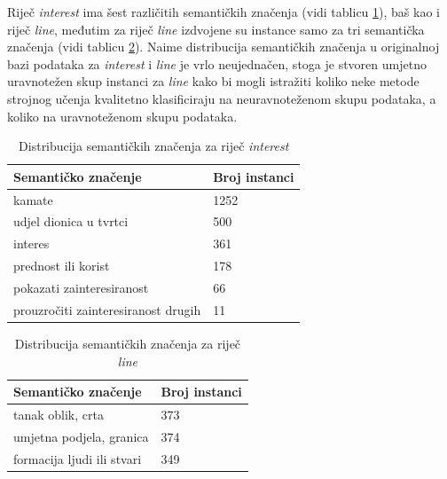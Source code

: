 \documentclass[10pt, a4paper]{article}
\begin{document}
Riječ \emph{interest} ima šest različitih semantičkih značenja (vidi tablicu \ref{tab:interest_distribution}), baš kao i riječ \emph{line},
međutim za riječ \emph{line} izdvojene su instance samo za tri semantička značenja
(vidi tablicu \ref{tab:line_distribution}). Naime distribucija semantičkih značenja u 
originalnoj bazi podataka za \emph{interest} i \emph{line} je vrlo neujednačen,
stoga je stvoren umjetno uravnotežen skup instanci za \emph{line} kako
bi mogli istražiti koliko neke metode strojnog učenja
kvalitetno klasificiraju na neuravnoteženom skupu podataka, 
a koliko na uravnoteženom skupu podataka.

\begin{table}[!hbtp]
\caption{Distribucija semantičkih značenja za riječ \emph{interest}}
\label{tab:interest_distribution}
\begin{center}
\begin{tabular}{ll}
\toprule
Semantičko značenje & Broj instanci \\
\midrule
kamate 											& 1252\\
udjel dionica u tvrtci  						& 500\\
interes  	 									& 361\\
prednost ili korist 							& 178\\
pokazati zainteresiranost						& 66\\
prouzročiti zainteresiranost drugih 			& 11\\
\bottomrule
\end{tabular}
\end{center}
\end{table}

\begin{table}[!hbtp]
\caption{Distribucija semantičkih značenja za riječ \emph{line}}
\label{tab:line_distribution}
\begin{center}
\begin{tabular}{ll}
\toprule
Semantičko značenje & Broj instanci \\
\midrule
tanak oblik, crta							& 373\\
umjetna podjela, granica 					& 374\\
formacija ljudi ili stvari					& 349\\
\bottomrule
\end{tabular}
\end{center}
\end{table}
\end{document}
